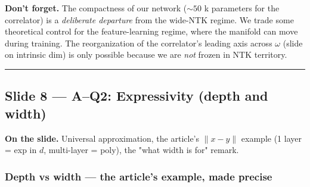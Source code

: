 \documentclass[11pt]{article}
\begin{document}
\textbf{Don't forget.} The compactness of our network ($\sim 50$ k parameters
for the correlator) is a \emph{deliberate departure} from the wide-NTK regime.
We trade some theoretical control for the feature-learning regime, where
the manifold can move during training. The reorganization of the
correlator's leading axis across $\omega$ (slide on intrinsic dim) is only
possible because we are \emph{not} frozen in NTK territory.

\vspace{4pt}\hrule\vspace{8pt}

\subsection*{Slide 8 --- A--Q2: Expressivity (depth and width)}

\textbf{On the slide.} Universal approximation, the article's $\|x - y\|$
example (1 layer = exp in $d$, multi-layer = poly), the "what width is
for" remark.

\subsubsection*{Depth vs width --- the article's example, made precise}
\end{document}
